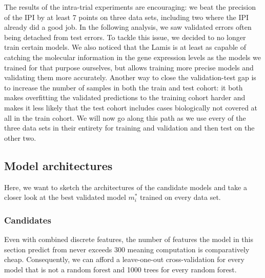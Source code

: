 The results of the intra-trial experiments are encouraging: we beat the precision of the IPI by 
at least \num{7} points on three data sets, including two where the IPI already did a good job. 
In the following analysis, we saw validated errors often being detached from test errors. To tackle 
this issue, we decided to no longer train certain models. We also noticed that the Lamis is at least 
as capable of catching the molecular information in the gene expression levels as the models
we trained for that purpose ourselves, but allows training more precise models and validating them 
more accurately. Another way to close the validation-test gap is to increase the number of samples 
in both the train and test cohort: it both makes overfitting the validated predictions to the 
training cohort harder and makes it less likely that the test cohort includes cases biologically 
not covered at all in the train cohort. We will now go along this path as we use every of the 
three data sets in their entirety for training and validation and then test on the other two.

\subsection{Model architectures}

Here, we want to sketch the architectures of the candidate models and take a closer look at the 
best validated model $m_i^*$ trained on every data set.

\subsubsection{Candidates}

Even with combined discrete features, the number of features the model in this section predict from 
never exceeds \num{300} meaning computation is comparatively cheap. Consequently, we can afford 
a leave-one-out cross-validation for every model that is not a random forest and \num{1000} trees 
for every random forest.


